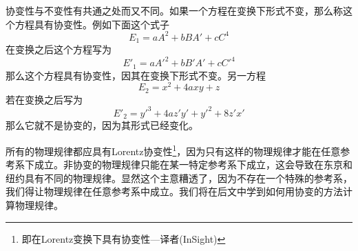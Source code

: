 协变性与不变性有共通之处而又不同。如果一个方程在变换下形式不变，那么称这个方程具有协变性。例如下面这个式子
\[
E_1=a A^2+bBA'+cC^4
\]
在变换之后这个方程写为
\[
E'_1=a A'^2+bB'A'+cC'^4
\]
那么这个方程具有协变性，因其在变换下形式不变。另一方程
\[
E_2=x^2+4axy+z
\]
若在变换之后写为
\[
E'_2=y'^3+4az'y'+y'^2+8z'x'
\]
那么它就不是协变的，因为其形式已经变化。

所有的物理规律都应具有Lorentz协变性\footnote{即在Lorentz变换下具有协变性---译者(InSight)}，因为只有这样的物理规律才能在任意参考系下成立。非协变的物理规律只能在某一特定参考系下成立，这会导致在东京和纽约具有不同的物理规律。显然这个主意糟透了，因为不存在一个特殊的参考系，我们得让物理规律在任意参考系中成立。我们将在后文中学到如何用协变的方法计算物理规律。

